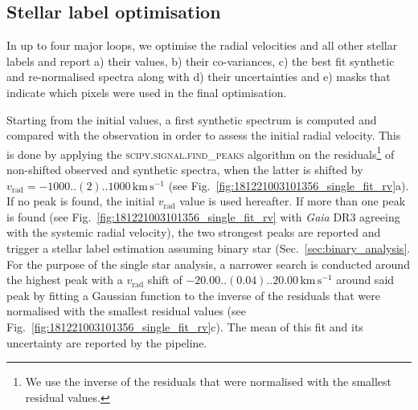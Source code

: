 \documentclass[
  journal=pasa,
  manuscript=research-paper, %
  year=2023,
  volume=37
]{cup-journal}
\newcommand{\SB}[1]{{\textcolor{purple}{#1}}}
\newcommand{\Teff}{$T_\mathrm{eff}$\xspace}
\newcommand{\logg}{$\log g$\xspace}
\newcommand{\feh}{$\mathrm{[Fe/H]}$\xspace}
\newcommand{\vrad}{$v_\mathrm{rad}$\xspace}
\newcommand{\TheCannon}{\textit{The Cannon}\xspace}
\newcommand{\Gaia}{\textit{Gaia}\xspace}
\newcommand{\dex}{\,\mathrm{dex}}	%
\newcommand{\K}{\,\mathrm{K}}	%
\newcommand{\kms}{\,\mathrm{km\,s^{-1}}}	%
\begin{document}

\subsection{Stellar label optimisation}
\label{sec:stellar_label_optimisation}

In up to four major loops, we optimise the radial velocities and all other stellar labels and report a) their values, b) their co-variances, c) the best fit synthetic and re-normalised spectra along with d) their uncertainties and e) masks that indicate which pixels were used in the final optimisation.

Starting from the initial values, a first synthetic spectrum is computed and compared with the observation in order to assess the initial radial velocity. This is done by applying the \textsc{scipy.signal.find\_peaks} algorithm on the residuals\footnote{We use the inverse of the residuals that were normalised with the smallest residual values.} of non-shifted observed and synthetic spectra, when the latter is shifted by $v_\text{rad} = -1000..(2)..1000\kms$ (see Fig.~\ref{fig:181221003101356_single_fit_rv}a). If no peak is found, the initial \vrad value is used hereafter. If more than one peak is found (see Fig.~\ref{fig:181221003101356_single_fit_rv} with \Gaia DR3 agreeing with the systemic radial velocity), the two strongest peaks are reported and trigger a stellar label estimation assuming binary star (Sec.~\ref{sec:binary_analysis}. For the purpose of the single star analysis, a narrower search is conducted around the highest peak with a \vrad shift of $-20.00..(0.04)..20.00\kms$ around said peak by fitting a Gaussian function to the inverse of the residuals that were normalised with the smallest residual values (see Fig.~\ref{fig:181221003101356_single_fit_rv}c). The mean of this fit and its uncertainty are reported by the pipeline.
\end{document}
